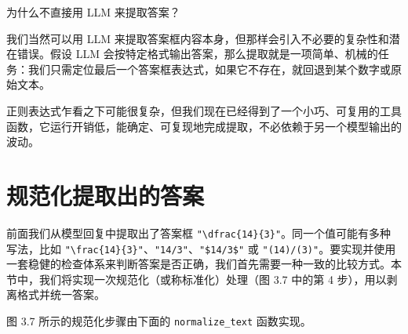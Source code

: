 \begin{mySidebar}{为什么不直接用 LLM 来提取答案？}

我们当然可以用 LLM 来提取答案框内容本身，但那样会引入不必要的复杂性和潜在错误。假设 LLM 会按特定格式输出答案，那么提取就是一项简单、机械的任务：我们只需定位最后一个答案框表达式，如果它不存在，就回退到某个数字或原始文本。

正则表达式乍看之下可能很复杂，但我们现在已经得到了一个小巧、可复用的工具函数，它运行开销低，能确定、可复现地完成提取，不必依赖于另一个模型输出的波动。

\end{mySidebar}

\section{规范化提取出的答案}

前面我们从模型回复中提取出了答案框 \texttt{"}\texttt{\textbackslash dfrac\{14\}\{3\}}\texttt{"}。同一个值可能有多种写法，比如 \texttt{"}\texttt{\textbackslash frac\{14\}\{3\}}\texttt{"}、\texttt{"}\texttt{14/3}\texttt{"}、\texttt{"}\texttt{\$14/3\$}\texttt{"} 或 \texttt{"}\texttt{(14)/(3)}\texttt{"}。要实现并使用一套稳健的检查体系来判断答案是否正确，我们首先需要一种一致的比较方式。本节中，我们将实现一次规范化（或称标准化）处理（图 3.7 中的第 4 步），用以剥离格式并统一答案。


图 3.7 所示的规范化步骤由下面的 \texttt{normalize\_­text} 函数实现。

